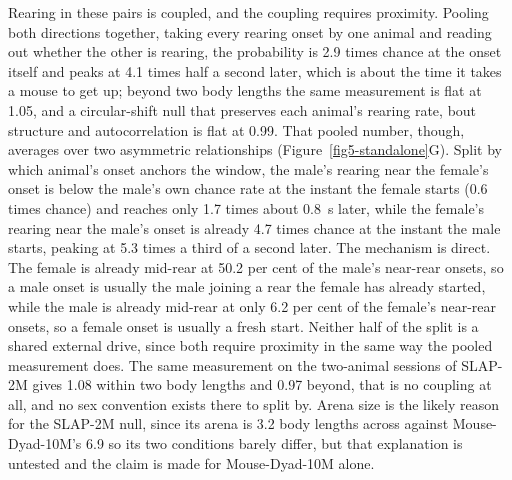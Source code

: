 \documentclass[11pt]{article}
\begin{document}
Rearing in these pairs is coupled, and the coupling requires proximity. Pooling both directions together, taking every rearing onset by one animal and reading out whether the other is rearing, the probability is 2.9 times chance at the onset itself and peaks at 4.1 times half a second later, which is about the time it takes a mouse to get up; beyond two body lengths the same measurement is flat at 1.05, and a circular-shift null that preserves each animal's rearing rate, bout structure and autocorrelation is flat at 0.99. That pooled number, though, averages over two asymmetric relationships (Figure~\ref{fig5-standalone}G). Split by which animal's onset anchors the window, the male's rearing near the female's onset is below the male's own chance rate at the instant the female starts (0.6 times chance) and reaches only 1.7 times about 0.8~s later, while the female's rearing near the male's onset is already 4.7 times chance at the instant the male starts, peaking at 5.3 times a third of a second later. The mechanism is direct. The female is already mid-rear at 50.2 per cent of the male's near-rear onsets, so a male onset is usually the male joining a rear the female has already started, while the male is already mid-rear at only 6.2 per cent of the female's near-rear onsets, so a female onset is usually a fresh start. Neither half of the split is a shared external drive, since both require proximity in the same way the pooled measurement does. The same measurement on the two-animal sessions of SLAP-2M gives 1.08 within two body lengths and 0.97 beyond, that is no coupling at all, and no sex convention exists there to split by. Arena size is the likely reason for the SLAP-2M null, since its arena is 3.2 body lengths across against Mouse-Dyad-10M's 6.9 so its two conditions barely differ, but that explanation is untested and the claim is made for Mouse-Dyad-10M alone.
\end{document}
